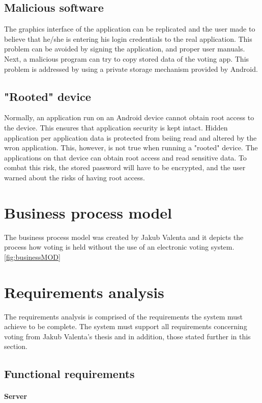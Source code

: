 \documentclass[11pt,twoside,a4paper]{book}
\begin{document}
\subsection{Malicious software}
The graphics interface of the application can be replicated and the user made to believe that he/she is entering his login credentials to the real application. This problem can be avoided by signing the application, and proper user manuals.\\
Next, a malicious program can try to copy stored data of the voting app. This problem is addressed by using a private storage mechanism provided by Android. \cite{storageAnd}

\subsection{"Rooted" device}
Normally, an application run on an Android device cannot obtain root access to the device. This ensures that application security is kept intact. Hidden application per application data is protected from beiing read and altered by the wron application. This, however, is not true when running a "rooted" device. The applications on that device can obtain root access and read sensitive data. To combat this risk, the stored password will have to be encrypted, and the user warned about the risks of having root access.


\section{Business process model}
The business process model was created by Jakub Valenta and it depicts the process how voting is held without the use of an electronic voting system. \cite{bakalarkaJV} \ref{fig:businessMOD}

\section{Requirements analysis}
The requirements analysis is comprised of the requirements the system must achieve to be complete. The system must support all requirements concerning voting from Jakub Valenta's thesis and in addition, those stated further in this section.
\subsection{Functional requirements}
\paragraph*{Server}
\end{document}
